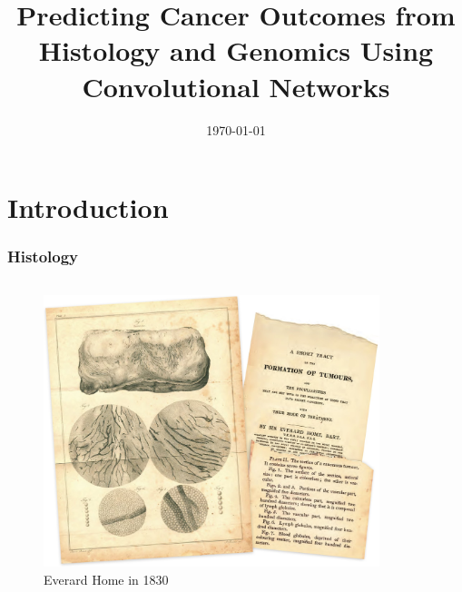 \message{ !name(presentation.tex)}\documentclass[usenames,dvipsnames]{beamer}
\title[SCNN]{Predicting Cancer Outcomes from Histology and Genomics Using Convolutional Networks}
\author[Dogan]
{%
\texorpdfstring{
  \begin{columns}
    \column{.85\linewidth}
    \centering
    Presented by:\\
    Haluk Dogan\\
    \url{https://haluk.github.io/}\\
    \href{mailto:hdogan@vivaldi.net}{hdogan@vivaldi.net} \\
  \end{columns}
}
{Dogan}
}
\institute[SBBI {\fontsize{5}{6}\selectfont @} CSE {\fontsize{5}{6}\selectfont
  @} UNL] %
{
  Department of Computer Science\\
  University of Nebraska-Lincoln
}
\date[\today] %
{\today}
\begin{document}


\begin{frame}
  \titlepage{}
\end{frame}

\section{Introduction}\label{sec:introduction}
\begin{frame}
  \frametitle{Histology}
  \begin{columns}[t]
    \begin{column}{.48\textwidth}
      \vspace{-0.8cm}
      \begin{figure}[ht]
        \centering
        \includegraphics[width=1.0\textwidth,height=0.7\textheight]{figures/early_histology.jpg}
        \caption*{Everard Home in 1830\label{fig:early-histology}}
      \end{figure}
    \end{column}
    \begin{column}{.48\textwidth}
      \vspace{-0.5cm}
      \begin{figure}[ht]
        \centering

\end{figure}
\end{column}
\end{columns}
\end{frame}
\end{document}
